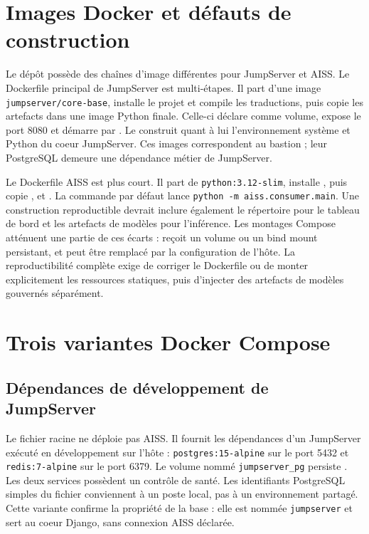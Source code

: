 \documentclass[11pt,a4paper,oneside]{report}
\theoremstyle{definition}
\theoremstyle{plain}
\begin{document}
\section{Images Docker et défauts de construction}

Le dépôt possède des chaînes d'image différentes pour JumpServer et AISS. Le
Dockerfile principal de JumpServer est multi-étapes. Il part d'une image
\texttt{jumpserver/core-base}, installe le projet et compile les traductions,
puis copie les artefacts dans une image Python finale. Celle-ci déclare
 comme volume, expose le port 8080 et démarre par
. Le  construit quant à lui
l'environnement système et Python du coeur JumpServer. Ces images
correspondent au bastion ; leur PostgreSQL demeure une dépendance métier de
JumpServer.

Le Dockerfile AISS est plus court. Il part de
\texttt{python:3.12-slim}, installe , puis copie
,  et . La commande par défaut lance
\texttt{python -m aiss.consumer.main}. Une construction reproductible devrait
inclure également le répertoire  pour le tableau de bord et les
artefacts de modèles pour l'inférence. Les montages Compose atténuent une
partie de ces écarts :  reçoit un volume ou un bind mount
persistant, et  peut être remplacé par la configuration de
l'hôte. La reproductibilité complète exige de corriger le Dockerfile ou de
monter explicitement les ressources statiques, puis d'injecter des artefacts
de modèles gouvernés séparément.

\section{Trois variantes Docker Compose}

\subsection{Dépendances de développement de JumpServer}

Le fichier racine  ne déploie pas AISS. Il
fournit les dépendances d'un JumpServer exécuté en développement sur l'hôte :
\texttt{postgres:15-alpine} sur le port 5432 et
\texttt{redis:7-alpine} sur le port 6379. Le volume nommé
\texttt{jumpserver\_pg} persiste . Les deux
services possèdent un contrôle de santé. Les identifiants PostgreSQL simples
du fichier conviennent à un poste local, pas à un environnement partagé.
Cette variante confirme la propriété de la base : elle est nommée
\texttt{jumpserver} et sert au coeur Django, sans connexion AISS déclarée.
\end{document}
